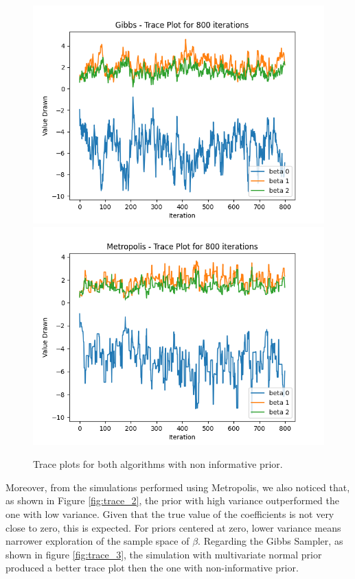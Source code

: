 \documentclass{article}
\begin{document}
\begin{figure}[htp]
    \centering
    \includegraphics[scale=0.6]{images/trace_gibbs_noinfo_800_warmup_0.png}
    \includegraphics[scale=0.6]{images/trace_metropolis_noinfo_800_warmup_0.png}
    \caption{Trace plots for both algorithms with non informative prior.}
    \label{fig:trace_1}
\end{figure}



Moreover, from the simulations performed using Metropolis, we also noticed that, as shown in Figure \ref{fig:trace_2}, the prior with high variance outperformed the one with low variance. Given that the true value of the coefficients is not very close to zero, this is expected. For priors centered at zero, lower variance means narrower exploration of the sample space of \(\beta\). Regarding the Gibbs Sampler, as shown in figure \ref{fig:trace_3}, the simulation with multivariate normal prior produced a better trace plot then the one with non-informative prior. 
\end{document}
